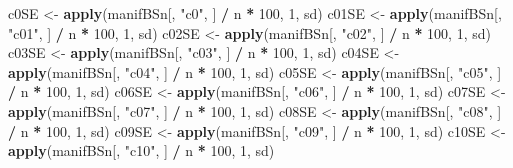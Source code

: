 \documentclass[
]{book}
\newenvironment{Shaded}{\begin{snugshade}}{\end{snugshade}}
\newcommand{\DecValTok}[1]{\textcolor[rgb]{0.00,0.00,0.81}{#1}}
\newcommand{\FunctionTok}[1]{\textcolor[rgb]{0.13,0.29,0.53}{\textbf{#1}}}
\newcommand{\NormalTok}[1]{#1}
\newcommand{\OtherTok}[1]{\textcolor[rgb]{0.56,0.35,0.01}{#1}}
\newcommand{\SpecialCharTok}[1]{\textcolor[rgb]{0.81,0.36,0.00}{\textbf{#1}}}
\newcommand{\StringTok}[1]{\textcolor[rgb]{0.31,0.60,0.02}{#1}}
\begin{document}
\begin{Shaded}
\begin{Highlighting}[]
\NormalTok{c0SE  }\OtherTok{\textless{}{-}} \FunctionTok{apply}\NormalTok{(manifBSn[, }\StringTok{"c0"}\NormalTok{, ]  }\SpecialCharTok{/}\NormalTok{ n }\SpecialCharTok{*} \DecValTok{100}\NormalTok{, }\DecValTok{1}\NormalTok{, sd)}
\NormalTok{c01SE }\OtherTok{\textless{}{-}} \FunctionTok{apply}\NormalTok{(manifBSn[, }\StringTok{"c01"}\NormalTok{, ] }\SpecialCharTok{/}\NormalTok{ n }\SpecialCharTok{*} \DecValTok{100}\NormalTok{, }\DecValTok{1}\NormalTok{, sd)}
\NormalTok{c02SE }\OtherTok{\textless{}{-}} \FunctionTok{apply}\NormalTok{(manifBSn[, }\StringTok{"c02"}\NormalTok{, ] }\SpecialCharTok{/}\NormalTok{ n }\SpecialCharTok{*} \DecValTok{100}\NormalTok{, }\DecValTok{1}\NormalTok{, sd)}
\NormalTok{c03SE }\OtherTok{\textless{}{-}} \FunctionTok{apply}\NormalTok{(manifBSn[, }\StringTok{"c03"}\NormalTok{, ] }\SpecialCharTok{/}\NormalTok{ n }\SpecialCharTok{*} \DecValTok{100}\NormalTok{, }\DecValTok{1}\NormalTok{, sd)}
\NormalTok{c04SE }\OtherTok{\textless{}{-}} \FunctionTok{apply}\NormalTok{(manifBSn[, }\StringTok{"c04"}\NormalTok{, ] }\SpecialCharTok{/}\NormalTok{ n }\SpecialCharTok{*} \DecValTok{100}\NormalTok{, }\DecValTok{1}\NormalTok{, sd)}
\NormalTok{c05SE }\OtherTok{\textless{}{-}} \FunctionTok{apply}\NormalTok{(manifBSn[, }\StringTok{"c05"}\NormalTok{, ] }\SpecialCharTok{/}\NormalTok{ n }\SpecialCharTok{*} \DecValTok{100}\NormalTok{, }\DecValTok{1}\NormalTok{, sd)}
\NormalTok{c06SE }\OtherTok{\textless{}{-}} \FunctionTok{apply}\NormalTok{(manifBSn[, }\StringTok{"c06"}\NormalTok{, ] }\SpecialCharTok{/}\NormalTok{ n }\SpecialCharTok{*} \DecValTok{100}\NormalTok{, }\DecValTok{1}\NormalTok{, sd)}
\NormalTok{c07SE }\OtherTok{\textless{}{-}} \FunctionTok{apply}\NormalTok{(manifBSn[, }\StringTok{"c07"}\NormalTok{, ] }\SpecialCharTok{/}\NormalTok{ n }\SpecialCharTok{*} \DecValTok{100}\NormalTok{, }\DecValTok{1}\NormalTok{, sd)}
\NormalTok{c08SE }\OtherTok{\textless{}{-}} \FunctionTok{apply}\NormalTok{(manifBSn[, }\StringTok{"c08"}\NormalTok{, ] }\SpecialCharTok{/}\NormalTok{ n }\SpecialCharTok{*} \DecValTok{100}\NormalTok{, }\DecValTok{1}\NormalTok{, sd)}
\NormalTok{c09SE }\OtherTok{\textless{}{-}} \FunctionTok{apply}\NormalTok{(manifBSn[, }\StringTok{"c09"}\NormalTok{, ] }\SpecialCharTok{/}\NormalTok{ n }\SpecialCharTok{*} \DecValTok{100}\NormalTok{, }\DecValTok{1}\NormalTok{, sd)}
\NormalTok{c10SE }\OtherTok{\textless{}{-}} \FunctionTok{apply}\NormalTok{(manifBSn[, }\StringTok{"c10"}\NormalTok{, ] }\SpecialCharTok{/}\NormalTok{ n }\SpecialCharTok{*} \DecValTok{100}\NormalTok{, }\DecValTok{1}\NormalTok{, sd)}

\end{Highlighting}
\end{Shaded}
\end{document}
